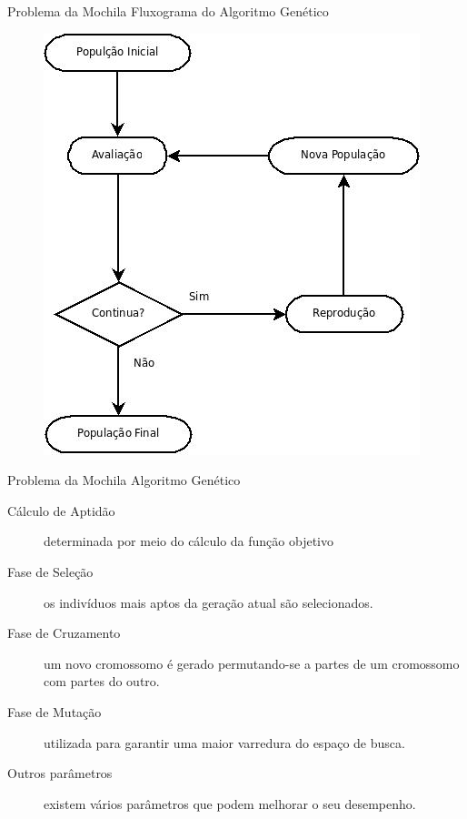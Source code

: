 \documentclass[slidestop,compress,mathserif]{beamer}
\begin{document}
\begin{frame} {Problema da Mochila} {Fluxograma do Algoritmo Genético}

\begin{figure}[htp]
	\centering
	\includegraphics[scale=0.4]{images/fluxo.jpg}
	\label{fig:fluxo}
\end{figure}

\end{frame}


\begin{frame} {Problema da Mochila} {Algoritmo Genético}

\begin{description}

	\item[Cálculo de Aptidão] determinada por meio do cálculo da função objetivo

	\item[Fase de Seleção] os indivíduos mais aptos da geração atual são selecionados.

	\item[Fase de Cruzamento] um novo cromossomo é gerado permutando-se a partes de um cromossomo com partes do outro.

	\item[Fase de Mutação] utilizada para garantir uma maior varredura do espaço de busca.

	\item[Outros parâmetros] existem vários parâmetros que podem melhorar o seu desempenho.

\end{description}

\end{frame}
\end{document}
